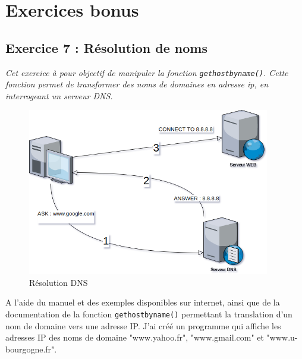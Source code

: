\inputminted[linenos,firstline=65, lastline=98]{cpp}{../sources/cpp/TP7-8/serveurTCP.c}

\section{Exercices bonus}

\subsection{Exercice 7 : Résolution de noms}
\textit{Cet exercice à pour objectif de manipuler la fonction \texttt{gethostbyname()}. Cette fonction permet de transformer des noms de domaines en adresse ip, en interrogeant un serveur DNS.}

\begin{figure}[H]
\centering
\includegraphics[width=300pt]{./cpp/Pictures/tp7+tp8-DNS}
\caption{Résolution DNS}
\label{Résolution DNS}
\end{figure}

A l’aide du manuel et des exemples disponibles sur internet, ainsi que de la documentation de la fonction \texttt{gethostbyname()} permettant la translation d’un nom de domaine vers une adresse IP. J'ai créé un programme qui affiche les adresses IP des noms de domaine "www.yahoo.fr", "www.gmail.com" et "www.u-bourgogne.fr".

\inputminted[linenos,firstline=10, lastline=36]{cpp}{../sources/cpp/TP7-8/getHostByName.c}

